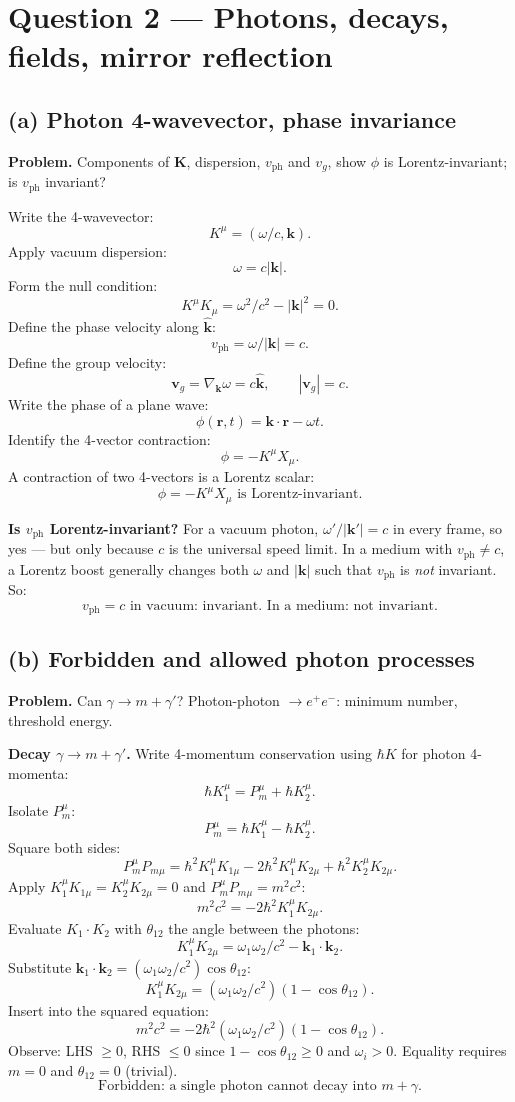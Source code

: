 \documentclass[11pt]{article}
\begin{document}
\section*{Question 2 --- Photons, decays, fields, mirror reflection}

\subsection*{(a) Photon 4-wavevector, phase invariance}

\textbf{Problem.} Components of $\bm K$, dispersion, $v_\text{ph}$ and $v_g$, show $\phi$ is Lorentz-invariant; is $v_\text{ph}$ invariant?

Write the 4-wavevector:
\[ K^\mu = (\omega/c,\bm k). \]
Apply vacuum dispersion:
\[ \omega = c|\bm k|. \]
Form the null condition:
\[ K^\mu K_\mu = \omega^2/c^2 - |\bm k|^2 = 0. \]
Define the phase velocity along $\hat{\bm k}$:
\[ v_\text{ph} = \omega/|\bm k| = c. \]
Define the group velocity:
\[ \bm v_g = \nabla_{\bm k}\omega = c\hat{\bm k},\qquad |\bm v_g|=c. \]
Write the phase of a plane wave:
\[ \phi(\bm r,t) = \bm k\!\cdot\!\bm r - \omega t. \]
Identify the 4-vector contraction:
\[ \phi = -K^\mu X_\mu. \]
A contraction of two 4-vectors is a Lorentz scalar:
\[ \boxed{\;\phi = -K^\mu X_\mu \text{ is Lorentz-invariant.}\;} \]

\noindent\textbf{Is $v_\text{ph}$ Lorentz-invariant?} For a vacuum photon, $\omega'/|\bm k'|=c$ in every frame, so yes --- but only because $c$ is the universal speed limit. In a medium with $v_\text{ph}\neq c$, a Lorentz boost generally changes both $\omega$ and $|\bm k|$ such that $v_\text{ph}$ is \emph{not} invariant. So:
\[ \boxed{\;v_\text{ph}=c\text{ in vacuum: invariant. In a medium: not invariant.}\;} \]

\subsection*{(b) Forbidden and allowed photon processes}

\textbf{Problem.} Can $\gamma\to m+\gamma'$? Photon-photon $\to e^+e^-$: minimum number, threshold energy.

\textbf{Decay $\gamma\to m+\gamma'$.} Write 4-momentum conservation using $\hbar K$ for photon 4-momenta:
\[ \hbar K_1^\mu = P_m^\mu + \hbar K_2^\mu. \]
Isolate $P_m^\mu$:
\[ P_m^\mu = \hbar K_1^\mu - \hbar K_2^\mu. \]
Square both sides:
\[ P_m^\mu P_{m\mu} = \hbar^2 K_1^\mu K_{1\mu} - 2\hbar^2 K_1^\mu K_{2\mu} + \hbar^2 K_2^\mu K_{2\mu}. \]
Apply $K_1^\mu K_{1\mu} = K_2^\mu K_{2\mu} = 0$ and $P_m^\mu P_{m\mu} = m^2c^2$:
\[ m^2c^2 = -2\hbar^2 K_1^\mu K_{2\mu}. \]
Evaluate $K_1\cdot K_2$ with $\theta_{12}$ the angle between the photons:
\[ K_1^\mu K_{2\mu} = \omega_1\omega_2/c^2 - \bm k_1\!\cdot\!\bm k_2. \]
Substitute $\bm k_1\!\cdot\!\bm k_2 = (\omega_1\omega_2/c^2)\cos\theta_{12}$:
\[ K_1^\mu K_{2\mu} = (\omega_1\omega_2/c^2)(1-\cos\theta_{12}). \]
Insert into the squared equation:
\[ m^2c^2 = -2\hbar^2(\omega_1\omega_2/c^2)(1-\cos\theta_{12}). \]
Observe: LHS $\ge 0$, RHS $\le 0$ since $1-\cos\theta_{12}\ge 0$ and $\omega_i>0$. Equality requires $m=0$ and $\theta_{12}=0$ (trivial).
\[ \boxed{\;\text{Forbidden: a single photon cannot decay into }m+\gamma.\;} \]
\end{document}
